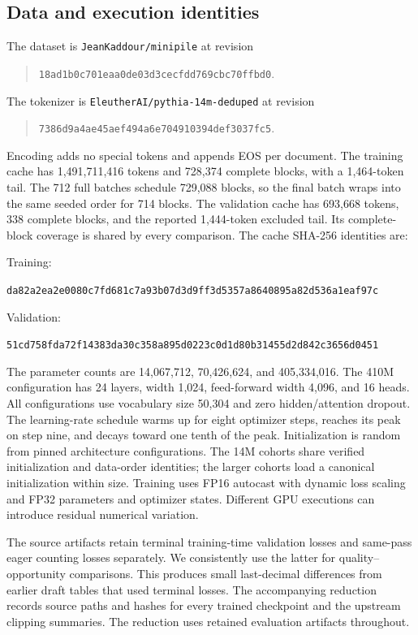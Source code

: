 \subsection{Data and execution identities}
The dataset is \texttt{JeanKaddour/minipile} at revision
\begin{quote}\small\texttt{18ad1b0c701eaa0de03d3cecfdd769cbc70ffbd0}.\end{quote}
The tokenizer is \texttt{EleutherAI/pythia-14m-deduped} at revision
\begin{quote}\small\texttt{7386d9a4ae45aef494a6e704910394def3037fc5}.\end{quote}
Encoding adds no special tokens and appends EOS per document.
The training cache has 1,491,711,416 tokens and 728,374 complete blocks,
with a 1,464-token tail. The 712 full batches schedule 729,088 blocks, so the
final batch wraps into the same seeded order for 714 blocks.
The validation cache has 693,668 tokens, 338 complete blocks, and the
reported 1,444-token excluded tail. Its complete-block coverage is shared
by every comparison. The cache SHA-256 identities are:
\par\smallskip\noindent Training:\par
{\scriptsize\noindent\texttt{da82a2ea2e0080c7fd681c7a93b07d3d9ff3d5357a8640895a82d536a1eaf97c}\par}
\smallskip\noindent Validation:\par
{\scriptsize\noindent\texttt{51cd758fda72f14383da30c358a895d0223c0d1d80b31455d2d842c3656d0451}\par}
\smallskip

The parameter counts are 14,067,712, 70,426,624, and 405,334,016.
The 410M configuration has 24 layers, width 1,024, feed-forward width 4,096,
and 16 heads. All configurations use vocabulary size 50,304 and zero
hidden/attention dropout. The learning-rate schedule warms up for eight
optimizer steps, reaches its peak on step nine, and decays toward one tenth
of the peak. Initialization is random from pinned architecture
configurations. The 14M cohorts share verified initialization and data-order
identities; the larger cohorts load a canonical initialization within size.
Training uses FP16 autocast with dynamic loss scaling and FP32 parameters
and optimizer states. Different GPU executions can introduce residual
numerical variation.

The source artifacts retain terminal training-time validation losses and
same-pass eager counting losses separately. We consistently use the latter
for quality--opportunity comparisons. This produces small last-decimal
differences from earlier draft tables that used terminal losses.
The accompanying reduction records source paths and hashes for every trained
checkpoint and the upstream clipping summaries. The reduction uses retained
evaluation artifacts throughout.

